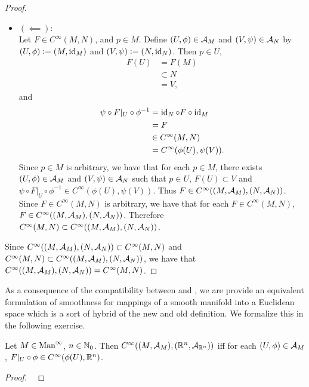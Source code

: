 \documentclass{book}
\begin{document}
\begin{proof}
\begin{itemize}
		\item $(\impliedby)$: \\
		Let $F \in C^{\infty}(M,N)$, and $p \in M$. Define $(U, \phi) \in \mathcal{A}_M$ and $(V, \psi) \in \mathcal{A}_N$ by $(U, \phi) \vcentcolon= (M, \operatorname{id}_M)$ and $(V, \psi) \vcentcolon= (N, \operatorname{id}_N)$. Then $p \in U$, 
		\begin{align*}
			F(U)
			& = F(M) \\
			& \subset N \\
			& = V,
		\end{align*}
		and 
		\begin{align*}
			\psi \circ F|_U \circ \phi^{-1} 
			& = \operatorname{id}_N \circ F \circ \operatorname{id}_M \\
			& = F \\
			& \in C^{\infty}(M,N) \\
			& = C^{\infty}(\phi(U), \psi(V)). 
		\end{align*}
		Since $p \in M$ is arbitrary, we have that for each $p \in M$, there exists $(U, \phi) \in \mathcal{A}_M$ and $(V, \psi) \in \mathcal{A}_N$ such that $p \in U$, $F(U) \subset V$ and $\psi \circ F|_U \circ \phi^{-1} \in C^{\infty}(\phi(U), \psi(V))$. Thus $F \in C^{\infty}((M, \mathcal{A}_M), (N, \mathcal{A}_N))$. Since $F \in C^{\infty}(M,N)$ is arbitrary, we have that for each $F \in C^{\infty}(M,N)$, $F \in C^{\infty}((M, \mathcal{A}_M), (N, \mathcal{A}_N))$. Therefore $C^{\infty}(M,N) \subset C^{\infty}((M, \mathcal{A}_M), (N, \mathcal{A}_N))$. 
	\end{itemize}
	Since $C^{\infty}((M, \mathcal{A}_M), (N, \mathcal{A}_N)) \subset C^{\infty}(M,N)$ and $C^{\infty}(M,N) \subset C^{\infty}((M, \mathcal{A}_M), (N, \mathcal{A}_N))$, we have that $C^{\infty}((M, \mathcal{A}_M), (N, \mathcal{A}_N)) = C^{\infty}(M,N)$.
\end{proof}

As a consequence of the compatibility between  and , we are provide an equivalent formulation of smoothness for mappings of a smooth manifold into a Euclidean space which is a sort of hybrid of the new and old definition. We formalize this in the following exercise. 

\begin{ex}
	Let $M \in \text{Man}^{\infty}$, $n \in \mathbb{N}_0$. Then $C^{\infty}((M, \mathcal{A}_{M}), (\mathbb{R}^n, \mathcal{A}_{\mathbb{R}^n}))$ iff for each $(U, \phi) \in \mathcal{A}_M$, $F|_U \circ \phi \in C^{\infty}(\phi(U), \mathbb{R}^n)$.  
\end{ex}

\begin{proof}\
\end{proof}
\end{document}
